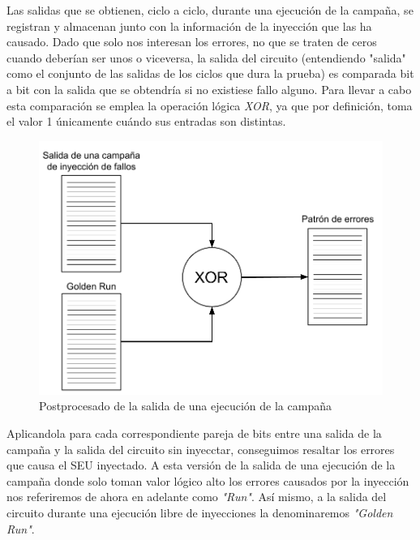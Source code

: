 Las salidas que se obtienen, ciclo a ciclo, durante una ejecución de la campaña, 
se registran y almacenan junto con la información de la inyección que las ha 
causado. Dado que solo nos interesan los errores, no que se traten de ceros cuando
deberían ser unos o viceversa, la salida del circuito (entendiendo "salida" como 
el conjunto de las salidas de los ciclos que dura la prueba) es comparada bit a 
bit con la salida que se obtendría si no existiese fallo alguno. Para llevar a 
cabo esta comparación se emplea la operación lógica \textit{XOR}, ya que por
definición, toma el valor 1 únicamente cuándo sus entradas son distintas.

\begin{figure}[htbp]
    \centering
    \includegraphics[width=0.95\linewidth]
    {InyeccionDeFallos/figuras/fig32.png}
    \caption{Postprocesado de la salida de una ejecución de la campaña}
    \label{fig:PostprocesadoSalida}
\end{figure}

Aplicandola para cada correspondiente pareja de bits entre una salida de la 
campaña y la salida del circuito sin inyecctar, conseguimos resaltar los errores
que causa el \gls{SEU} inyectado. A esta versión de la salida de una ejecución de
la campaña donde solo toman valor lógico alto los errores causados por la
inyección nos referiremos de ahora en adelante como \textit{"Run"}. Así mismo, a 
la salida del circuito durante una ejecución libre de inyecciones la denominaremos
\textit{"Golden Run"}.

